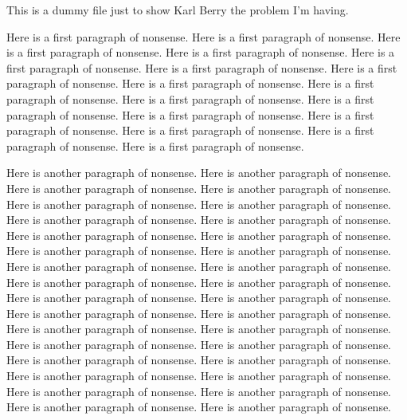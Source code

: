 %
%
%
%
%



This is a dummy file just to show Karl Berry the problem I'm having.

Here is a first paragraph of nonsense. Here is a first paragraph of  
nonsense. Here is a first paragraph of nonsense. Here is a first  
paragraph of nonsense. Here is a first paragraph of nonsense. Here is  
a first paragraph of nonsense. Here is a first paragraph of nonsense.  
Here is a first paragraph of nonsense. Here is a first paragraph of  
nonsense. Here is a first paragraph of nonsense. Here is a first  
paragraph of nonsense. Here is a first paragraph of nonsense. Here is  
a first paragraph of nonsense. Here is a first paragraph of nonsense.  
Here is a first paragraph of nonsense. Here is a first paragraph of  
nonsense.

Here is another paragraph of nonsense. Here is another paragraph of  
nonsense. Here is another paragraph of nonsense. Here is another  
paragraph of nonsense. Here is another paragraph of nonsense. Here is  
another paragraph of nonsense. Here is another paragraph of nonsense.  
Here is another paragraph of nonsense. Here is another paragraph of  
nonsense. Here is another paragraph of nonsense. Here is another  
paragraph of nonsense. Here is another paragraph of nonsense. Here is  
another paragraph of nonsense. Here is another paragraph of nonsense.  
Here is another paragraph of nonsense. Here is another paragraph of  
nonsense. Here is another paragraph of nonsense. Here is another  
paragraph of nonsense. Here is another paragraph of nonsense. Here is  
another paragraph of nonsense. Here is another paragraph of nonsense.  
Here is another paragraph of nonsense. Here is another paragraph of  
nonsense. Here is another paragraph of nonsense. Here is another  
paragraph of nonsense. Here is another paragraph of nonsense. Here is  
another paragraph of nonsense. Here is another paragraph of nonsense.  
Here is another paragraph of nonsense. Here is another paragraph of  
nonsense. Here is another paragraph of nonsense. Here is another  
paragraph of nonsense.

